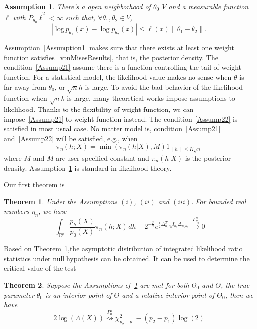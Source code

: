 \documentclass[review]{elsarticle}
\newtheorem{theorem}{Theorem}
\newtheorem{assumption}{\quad\quad Assumption}
\begin{document}
\begin{assumption}\label{Assumption3}
        There's a open neighborhood of $\theta_0$ $V$ and a measurable function $\dot{\ell}$ with $P_{\theta_0}\dot{\ell}^2<\infty$ such that, $\forall \theta_1,\theta_2\in V$,
        \begin{equation}
            |\log p_{\theta_1}(x)-\log p_{\theta_2}(x)|\leq \dot{\ell}(x)\|\theta_1-\theta_2\|.
        \end{equation}
\end{assumption}

Assumption~\ref{Assumption1} makes sure that there exists at least one weight function satisfies~\ref{vonMisesResults}, that is, the posterior density.
The condition~\ref{Assump21} assume there is a function controlling the tail of weight function. For a statistical model, the likelihood value makes no sense when $\theta$ is far away from $\theta_0$, or $\sqrt{n}h$ is large. To avoid the bad behavior of the likelihood function when $\sqrt{n}h$ is large, many theoretical works impose assumptions to likelihood. Thanks to the flexibility of weight function, we can impose~\ref{Assump21} to weight function instead. The condition~\ref{Assump22} is
satisfied in most usual case. No matter model is, condition~\ref{Assump21} and~\ref{Assump22} will be
satisfied, e.g., when 
\begin{equation}
    \pi_n(h;X)=\min(\pi_n(h|X),M) 1_{\|h\|\leq K\sqrt{n}}
\end{equation}
where $M$ and $M$ are user-specified constant and $\pi_n(h|X)$ is the posterior density.
Assumption~\ref{Assumption3} is standard in likelihood theory.

Our first theorem is
\begin{theorem}\label{theoremMain}
    Under the Assumptions $(i)$, $(ii)$ and $(iii)$. For bounded real numbers $\eta_n$, we have
    \begin{equation}
        \Big|\int_{\mathbb{R}^{p}}\frac{p_h(X)}{p_0(X)}\pi_n(h;X)\,dh-
        2^{-\frac{p}{2}}e^{\frac{1}{2}\Delta_{n,\theta_0}^T I_{\theta_0}\Delta_{n,\theta_0}}
        \Big|\xrightarrow{P_{\eta_n}^n}0
    \end{equation}
\end{theorem}


Based on Theorem~\ref{theoremMain},the asymptotic distribution of integrated likelihood ratio statistics under null hypothesis can be obtained. It can be used to determine the critical value of the test
\begin{theorem}\label{theoremWilks}
    Suppose the Assumptions of~\ref{theoremMain} are met for both $\Theta_0$ and $\Theta$,  the true parameter $\theta_0$ is an interior point of $\Theta$ and a relative interior point of $\Theta_0$, then we have
\begin{equation}
    2\log(\Lambda(X))\overset{P_0^n}{\rightsquigarrow} \chi^2_{p_2-p_1}-(p_2-p_1)\log(2)
\end{equation}

\end{theorem}
\end{document}
